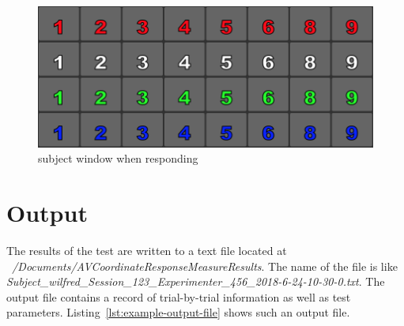 \documentclass[11pt,pdftex,letterpaper]{article}
\begin{document}
\begin{figure}
\centering
\includegraphics[width = 0.9\linewidth]{subject-response-window.png}
\caption{subject window when responding}
\label{fig:subject-response-window}
\end{figure}

\section{Output}
The results of the test are written to a text file located at \textit{\string~/Documents/AVCoordinateResponseMeasureResults}. The name of the file is like \textit{Subject\_wilfred\_Session\_123\_Experimenter\_456\_2018-6-24-10-30-0.txt}. The output file contains a record of trial-by-trial information as well as test parameters. Listing~\ref{lst:example-output-file} shows such an output file.

\noindent\begin{minipage}{\textwidth}

\end{minipage}
\end{document}
